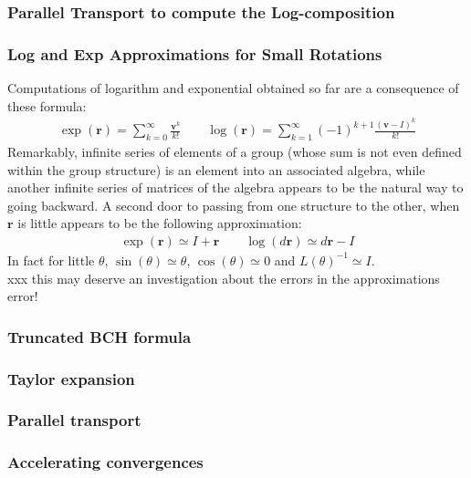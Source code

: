 \subsubsection{Parallel Transport to compute the Log-composition}




\subsubsection{Log and Exp Approximations for Small Rotations}
Computations of logarithm and exponential obtained so far are a consequence of these formula:
\begin{align*}
\exp(\mathbf{r}) = \sum_{k=0}^{\infty} \frac{\mathbf{v}^{k}}{k!}
\qquad 
\log(\mathbf{r}) = \sum_{k=1}^{\infty}(-1)^{k+1} \frac{(\mathbf{v}-I)^{k} }{k!}
\end{align*}
Remarkably, infinite series of elements of a group (whose sum is not even defined within the group structure) is an element into an associated algebra, while another infinite series of matrices of the algebra appears to be the natural way to going backward. A second door to passing from one structure to the other, when $\mathbf{r}$ is little appears to be the following approximation:
\begin{align*}
\exp(\mathbf{r}) \simeq I + \mathbf{r} 
\qquad 
\log(d\mathbf{r}) \simeq d\mathbf{r} - I
\end{align*}
In fact for little $\theta$, $\sin(\theta) \simeq \theta$, $\cos(\theta) \simeq 0 $ and $ L(\theta)^{-1} \simeq I$. \\
xxx this may deserve an investigation about the errors in the approximations error!




\subsubsection{Truncated BCH formula}

\subsubsection{Taylor expansion}

\subsubsection{Parallel transport}

\subsubsection{Accelerating convergences}

